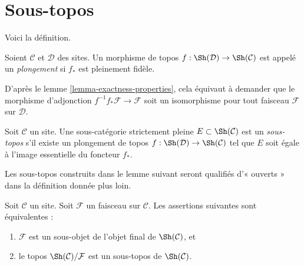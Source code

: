 \section{Sous-topos}
\label{section-subtopoi}

\noindent
Voici la définition.

\begin{definition}
\label{definition-embedding}
Soient $\mathcal{C}$ et $\mathcal{D}$ des sites.
Un morphisme de topos $f : \Sh(\mathcal{D}) \to \Sh(\mathcal{C})$
est appelé un {\it plongement} si $f_*$ est pleinement fidèle.
\end{definition}

\noindent
D'après le lemme \ref{lemma-exactness-properties},
cela équivaut à demander que le
morphisme d'adjonction $f^{-1}f_*\mathcal{F} \to \mathcal{F}$
soit un isomorphisme pour tout faisceau $\mathcal{F}$ sur $\mathcal{D}$.

\begin{definition}
\label{definition-subtopos}
Soit $\mathcal{C}$ un site. Une sous-catégorie strictement pleine
$E \subset \Sh(\mathcal{C})$ est un {\it sous-topos} s'il
existe un plongement de topos $f : \Sh(\mathcal{D}) \to \Sh(\mathcal{C})$
tel que $E$ soit égale à l'image essentielle du foncteur $f_*$.
\end{definition}

\noindent
Les sous-topos construits dans le lemme suivant seront qualifiés
d'« ouverts » dans la définition donnée plus loin.

\begin{lemma}
\label{lemma-open-subtopos}
Soit $\mathcal{C}$ un site. Soit $\mathcal{F}$ un faisceau sur
$\mathcal{C}$. Les assertions suivantes sont équivalentes :
\begin{enumerate}
\item $\mathcal{F}$ est un sous-objet de l'objet final de
$\Sh(\mathcal{C})$, et
\item le topos $\Sh(\mathcal{C})/\mathcal{F}$ est un sous-topos de
$\Sh(\mathcal{C})$.
\end{enumerate}
\end{lemma}

